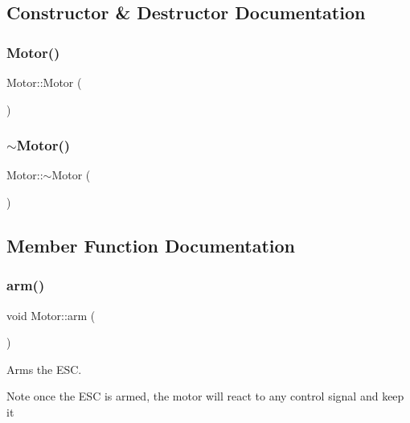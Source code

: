 \subsection{Constructor \& Destructor Documentation}
\mbox{\label{class_motor_af6106b4c506411265c5face762b6c004}} 
\subsubsection{\texorpdfstring{Motor()}{Motor()}}
{\footnotesize\ttfamily Motor\+::\+Motor (\begin{DoxyParamCaption}{ }\end{DoxyParamCaption})}

\mbox{\label{class_motor_a2e57c7b2681efea1d3b7f253ee88ecd4}} 
\subsubsection{\texorpdfstring{$\sim$\+Motor()}{~Motor()}}
{\footnotesize\ttfamily Motor\+::$\sim$\+Motor (\begin{DoxyParamCaption}{ }\end{DoxyParamCaption})\hspace{0.3cm}{\ttfamily [inline]}}



\subsection{Member Function Documentation}
\mbox{\label{class_motor_af21376271175d094adf9a077f70d2208}} 
\subsubsection{\texorpdfstring{arm()}{arm()}}
{\footnotesize\ttfamily void Motor\+::arm (\begin{DoxyParamCaption}{ }\end{DoxyParamCaption})}



Arms the E\+SC. 

\begin{DoxyNote}{Note}
once the E\+SC is armed, the motor will react to any control signal and keep it 
\end{DoxyNote}
\mbox{\label{class_motor_a0cffd54bdf0fa79b4ac7bae5ffd9a103}} 
